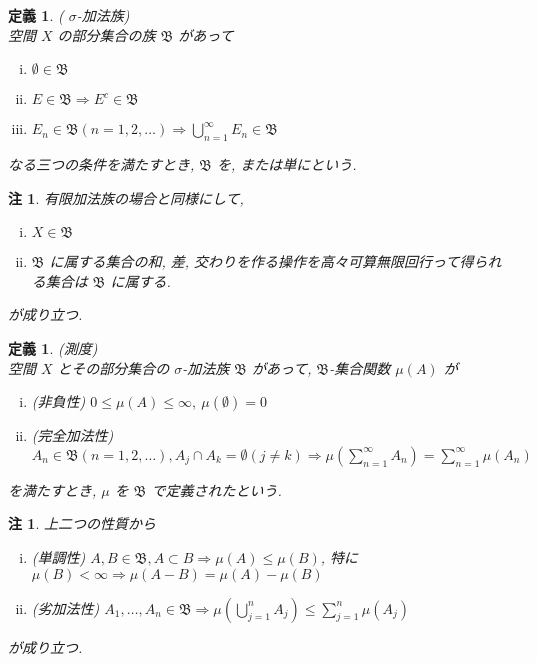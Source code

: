 \documentclass[dvipdfmx]{jsreport}
\newtheorem{defi}[theo]{定義}
\newtheorem{rema}[theo]{注}
\begin{document}
\begin{defi}
    ( $\sigma$-加法族) \\
    空間 $X$ の部分集合の族 $\mathfrak{B}$ があって
    \begin{enumerate}[(i)]
        \item $\emptyset \in \mathfrak{B}$
        \item $E \in \mathfrak{B} \Rightarrow E^c \in \mathfrak{B}$
        \item $\displaystyle E_n \in \mathfrak{B} (n = 1, 2, \dots) \Rightarrow \bigcup_{n = 1}^\infty E_n \in \mathfrak{B}$
    \end{enumerate}
    なる三つの条件を満たすとき, $\mathfrak{B}$ を, または単にという. 
\end{defi}

\begin{rema}
    有限加法族の場合と同様にして, 
    \begin{enumerate}[(i)]
        \item $X \in \mathfrak{B}$
        \item $\mathfrak{B}$ に属する集合の和, 差, 交わりを作る操作を高々可算無限回行って得られる集合は $\mathfrak{B}$ に属する. 
    \end{enumerate}
    が成り立つ. 
\end{rema}

\begin{defi}
    (測度) \\
    空間 $X$ とその部分集合の $\sigma$-加法族 $\mathfrak{B}$ があって, $\mathfrak{B}$-集合関数 $\mu(A)$ が
    \begin{enumerate}[(i)]
        \item (非負性) $0 \leq \mu(A) \leq \infty,\ \mu(\emptyset) = 0 $
        \item (完全加法性) $\displaystyle A_n \in \mathfrak{B} (n = 1, 2, \dots), A_j \cap A_k = \emptyset (j \neq k) \Rightarrow \mu\left( \sum_{n = 1}^\infty A_n \right) = \sum_{n = 1}^\infty \mu(A_n)$
    \end{enumerate}
    を満たすとき, $\mu$ を $\mathfrak{B}$ で定義されたという. 
\end{defi}
\begin{rema}
    上二つの性質から
    \begin{enumerate}[(i)]
        \item (単調性) $A, B \in \mathfrak{B}, A \subset B \Rightarrow \mu(A) \leq \mu(B)$, 特に $\mu(B) < \infty \Rightarrow \mu(A - B) = \mu(A) - \mu(B)$
        \item (劣加法性) $\displaystyle A_1, \dots, A_n \in \mathfrak{B} \Rightarrow \mu\left( \bigcup_{j = 1}^n A_j \right) \leq \sum_{j = 1}^n \mu(A_j)$
    \end{enumerate}
    が成り立つ. 
\end{rema}
\end{document}
